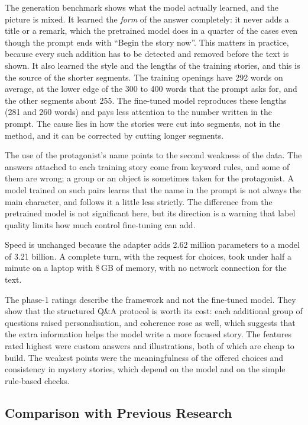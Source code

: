 The generation benchmark shows what the model actually learned, and the picture is mixed. It learned the \emph{form} of the answer completely: it never adds a title or a remark, which the pretrained model does in a quarter of the cases even though the prompt ends with ``Begin the story now''. This matters in practice, because every such addition has to be detected and removed before the text is shown. It also learned the style and the lengths of the training stories, and this is the source of the shorter segments. The training openings have 292 words on average, at the lower edge of the 300 to 400 words that the prompt asks for, and the other segments about 255. The fine-tuned model reproduces these lengths (281 and 260 words) and pays less attention to the number written in the prompt. The cause lies in how the stories were cut into segments, not in the method, and it can be corrected by cutting longer segments.

The use of the protagonist's name points to the second weakness of the data. The answers attached to each training story come from keyword rules, and some of them are wrong; a group or an object is sometimes taken for the protagonist. A model trained on such pairs learns that the name in the prompt is not always the main character, and follows it a little less strictly. The difference from the pretrained model is not significant here, but its direction is a warning that label quality limits how much control fine-tuning can add.

Speed is unchanged because the adapter adds 2.62 million parameters to a model of 3.21 billion. A complete turn, with the request for choices, took under half a minute on a laptop with 8\,GB of memory, with no network connection for the text.

The phase-1 ratings describe the framework and not the fine-tuned model. They show that the structured Q\&A protocol is worth its cost: each additional group of questions raised personalisation, and coherence rose as well, which suggests that the extra information helps the model write a more focused story. The features rated highest were custom answers and illustrations, both of which are cheap to build. The weakest points were the meaningfulness of the offered choices and consistency in mystery stories, which depend on the model and on the simple rule-based checks.

\subsection{Comparison with Previous Research}

